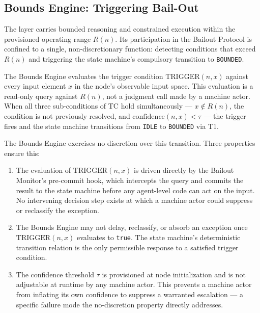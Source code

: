 \subsection{Bounds Engine: Triggering Bail-Out}\label{sec:bounds-trigger}

The \bounds{} layer carries bounded reasoning and constrained execution within the provisioned operating range $R(n)$. Its participation in the Bailout Protocol is confined to a single, non-discretionary function: detecting conditions that exceed $R(n)$ and triggering the state machine's compulsory transition to \texttt{BOUNDED}.

The Bounds Engine evaluates the trigger condition $\mathrm{TRIGGER}(n,x)$ against every input element $x$ in the node's observable input space. This evaluation is a read-only query against $R(n)$, not a judgment call made by a machine actor. When all three sub-conditions of TC hold simultaneously — $x\notin R(n)$, the condition is not previously resolved, and $\mathrm{confidence}(n,x)<\tau$ — the trigger fires and the state machine transitions from \texttt{IDLE} to \texttt{BOUNDED} via T1.

The Bounds Engine exercises no discretion over this transition. Three properties ensure this:

\begin{enumerate}\itemsep=0pt
\item The evaluation of $\mathrm{TRIGGER}(n,x)$ is driven directly by the Bailout Monitor's pre-commit hook, which intercepts the query and commits the result to the state machine before any agent-level code can act on the input. No intervening decision step exists at which a machine actor could suppress or reclassify the exception.

\item The Bounds Engine may not delay, reclassify, or absorb an exception once $\mathrm{TRIGGER}(n,x)$ evaluates to \texttt{true}. The state machine's deterministic transition relation is the only permissible response to a satisfied trigger condition.

\item The confidence threshold $\tau$ is provisioned at node initialization and is not adjustable at runtime by any machine actor. This prevents a machine actor from inflating its own confidence to suppress a warranted escalation — a specific failure mode the no-discretion property directly addresses.
\end{enumerate}

